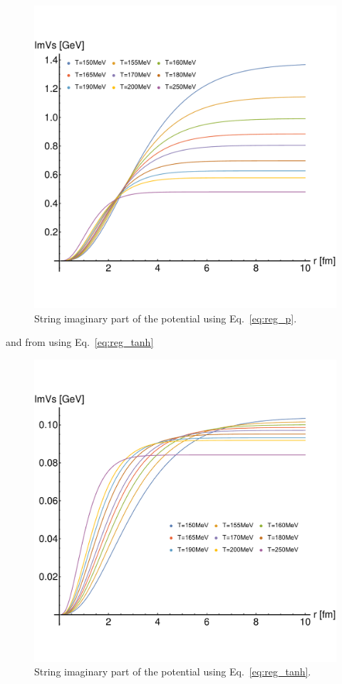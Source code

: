 \documentclass[12pt,a4paper]{article}
\begin{document}
\begin{figure}[H]
	\centering
	\includegraphics[width=\textwidth]{ImVs_p} 
	\caption{String imaginary part of the potential using Eq.~\eqref{eq:reg_p}.}
	\label{fig:ImVs_p}
\end{figure}
\clearpage
and from using Eq.~\eqref{eq:reg_tanh}
\begin{figure}[H]
	\centering
	\includegraphics[width=\textwidth]{ImVs_tanh} 
	\caption{String imaginary part of the potential using Eq.~\eqref{eq:reg_tanh}.}
	\label{fig:ImVs_tanh}
\end{figure}
\end{document}
